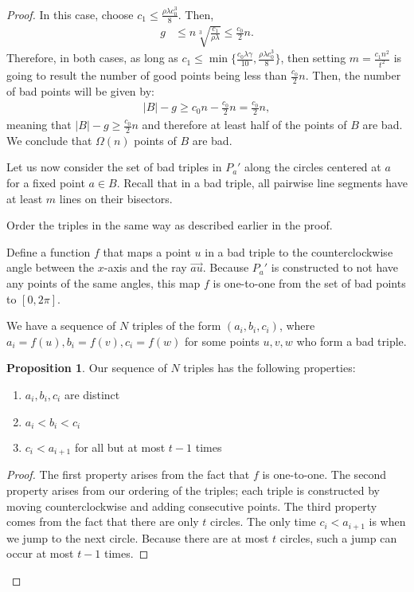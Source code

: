 \documentclass{scrippsthesisclass}
\theoremstyle{definition}
\newtheorem{proposition}[theorem]{Proposition}
\begin{document}
\begin{proof}
In this case, choose $c_1 \leq \frac{\rho \lambda c_0^3}{8}$.
Then,
\begin{align*}
    g & \leq n \sqrt[3]{\frac{c_1}{\rho \lambda}} \leq \frac{c_0}{2} n.
\end{align*}
Therefore, in both cases, as long as $c_1 \leq \min \{\frac{c_0 \lambda \gamma}{10}, \frac{\rho \lambda c_0^3}{8}\}$, then setting $m = \frac{c_1 n^2}{t^2}$ is going to result the number of good points being less than $\frac{c_0}{2} n$. 
Then, the number of bad points will be given by:
\begin{align}
    |B| - g \geq c_0 n - \frac{c_0}{2}n = \frac{c_0}{2}n,
\end{align}
meaning that $|B| - g \geq \frac{c_0}{2}n$ and therefore at least half of the points of $B$ are bad.
We conclude that $\Omega(n)$ points of $B$ are bad. 

Let us now consider the set of bad triples in $P_a'$ along the circles centered at $a$ for a fixed point $a \in B$. 
Recall that in a bad triple, all pairwise line segments have at least $m$ lines on their bisectors.

Order the triples in the same way as described earlier in the proof. 

Define a function $f$ that maps a point $u$ in a bad triple to the counterclockwise angle between the $x$-axis and the ray $\overrightarrow{au}$.
Because $P_a'$ is constructed to not have any points of the same angles, this map $f$ is one-to-one from the set of bad points to $[0, 2\pi]$.

We have a sequence of $N$ triples of the form $(a_i, b_i, c_i)$, where $a_i = f(u), b_i = f(v), c_i = f(w)$ for some points $u, v, w$ who form a bad triple.
\begin{proposition}
    Our sequence of $N$ triples has the following properties:
\begin{enumerate}
    \item $a_i, b_i, c_i$ are distinct
    \item $a_i < b_i < c_i$ 
    \item $c_i < a_{i+1}$ for all but at most $t - 1$ times
\end{enumerate}
\end{proposition}
\begin{proof}
    
The first property arises from the fact that $f$ is one-to-one. 
The second property arises from our ordering of the triples; each triple is constructed by moving counterclockwise and adding consecutive points.
The third property comes from the fact that there are only $t$ circles. 
The only time $c_i < a_{i+1}$ is when we jump to the next circle. Because there are at most $t$ circles, such a jump can occur at most $t - 1$ times. 
\end{proof}


\end{proof}
\end{document}
